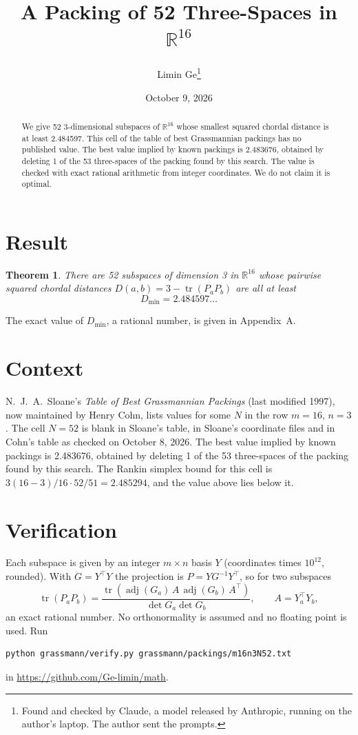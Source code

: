 \documentclass[11pt,a4paper]{article}
\title{A Packing of 52 Three-Spaces in $\mathbb{R}^{16}$}
\author{Limin Ge\thanks{Found and checked by Claude, a model released by Anthropic, running on the author's laptop. The author sent the prompts.}}
\date{October 9, 2026}
\newtheorem*{theorem}{Theorem}
\begin{document}
\maketitle
\begin{abstract}
We give 52 3-dimensional subspaces of $\mathbb{R}^{16}$ whose smallest squared chordal distance is at least 2.484597. This cell of the table of best Grassmannian packings has no published value. The best value implied by known packings is 2.483676, obtained by deleting 1 of the 53 three-spaces of the packing found by this search. The value is checked with exact rational arithmetic from integer coordinates. We do not claim it is optimal.
\end{abstract}

\section{Result}
\begin{theorem}
There are 52 subspaces of dimension 3 in $\mathbb{R}^{16}$ whose pairwise squared chordal distances $D(a,b) = 3 - \operatorname{tr}(P_aP_b)$ are all at least
\[ D_{\min} = 2.484597\ldots \]
\end{theorem}
The exact value of $D_{\min}$, a rational number, is given in Appendix~A.


\section{Context}
N.~J.~A.~Sloane's \emph{Table of Best Grassmannian Packings} (last modified 1997), now maintained by Henry Cohn, lists values for some $N$ in the row $m=16$, $n=3$. The cell $N=52$ is blank in Sloane's table, in Sloane's coordinate files and in Cohn's table as checked on October 8, 2026. The best value implied by known packings is 2.483676, obtained by deleting 1 of the 53 three-spaces of the packing found by this search. The Rankin simplex bound for this cell is $3(16-3)/16\cdot 52/51 = 2.485294$, and the value above lies below it.


\section{Verification}
Each subspace is given by an integer $m\times n$ basis $Y$ (coordinates times $10^{12}$, rounded). With $G=Y^\top Y$ the projection is $P=YG^{-1}Y^\top$, so for two subspaces
\[ \operatorname{tr}(P_aP_b)=\frac{\operatorname{tr}(\operatorname{adj}(G_a)\,A\,\operatorname{adj}(G_b)\,A^\top)}{\det G_a\det G_b},\qquad A=Y_a^\top Y_b, \]
an exact rational number. No orthonormality is assumed and no floating point is used. Run
\begin{verbatim}
python grassmann/verify.py grassmann/packings/m16n3N52.txt
\end{verbatim}
in \url{https://github.com/Ge-limin/math}.
\end{document}
